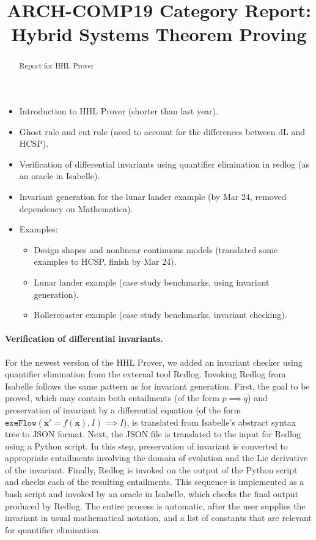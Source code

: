 \documentclass[runningheads,a4paper]{llncs}
\begin{document}
\author{}
\institute{}

\title{ARCH-COMP19 Category Report: Hybrid Systems Theorem Proving}

\maketitle

\begin{abstract}
  Report for HHL Prover
\end{abstract}


\begin{itemize}
\item Introduction to HHL Prover (shorter than last year).
\item Ghost rule and cut rule (need to account for the differences
  between dL and HCSP).
\item Verification of differential invariants using quantifier
  elimination in redlog (as an oracle in Isabelle).
\item Invariant generation for the lunar lander example (by Mar 24,
  removed dependency on Mathematica).
\item Examples:
  \begin{itemize}
  \item Design shapes and nonlinear continuous models (translated some
    examples to HCSP, finish by Mar 24).
  \item Lunar lander example (case study benchmarks, using invariant
    generation).
  \item Rollercoaster example (case study benchmarks, invariant
    checking).
  \end{itemize}
\end{itemize}

\paragraph{Verification of differential invariants.}

For the newest version of the HHL Prover, we added an invariant
checker using quantifier elimination from the external tool
Redlog. Invoking Redlog from Isabelle follows the same pattern as for
invariant generation. First, the goal to be proved, which may contain
both entailments (of the form $p\implies q$) and preservation of
invariant by a differential equation (of the form
$\mathtt{exeFlow}(\mathbf{x'}=f(\mathbf{x}),I)\implies I$), is
translated from Isabelle's abstract syntax tree to JSON format. Next,
the JSON file is translated to the input for Redlog using a Python
script. In this step, preservation of invariant is converted to
appropriate entailments involving the domain of evolution and the Lie
derivative of the invariant. Finally, Redlog is invoked on the output
of the Python script and checks each of the resulting
entailments. This sequence is implemented as a bash script and invoked
by an oracle in Isabelle, which checks the final output produced by
Redlog. The entire process is automatic, after the user supplies the
invariant in usual mathematical notation, and a list of constants that
are relevant for quantifier elimination.
\end{document}
